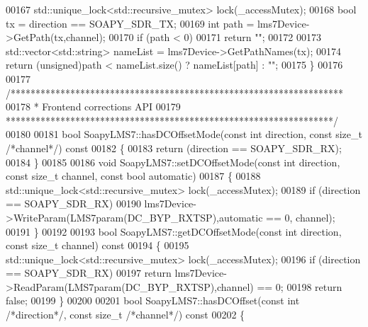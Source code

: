 \begin{DoxyCode}
{{{{{{00167     std::unique\_lock<std::recursive\_mutex> lock(_accessMutex);
00168     \textcolor{keywordtype}{bool} tx = direction == SOAPY_SDR_TX;
00169     \textcolor{keywordtype}{int} path = lms7Device->GetPath(tx,channel);
00170     \textcolor{keywordflow}{if} (path < 0)
00171         \textcolor{keywordflow}{return} \textcolor{stringliteral}{""};
00172 
00173     std::vector<std::string> nameList = lms7Device->GetPathNames(tx);
00174     \textcolor{keywordflow}{return} (\textcolor{keywordtype}{unsigned})path < nameList.size() ? nameList[path] : \textcolor{stringliteral}{""};
00175 \}
00176 
00177 \textcolor{comment}{/*******************************************************************}
00178 \textcolor{comment}{ * Frontend corrections API}
00179 \textcolor{comment}{ ******************************************************************/}
00180 
00181 \textcolor{keywordtype}{bool} SoapyLMS7::hasDCOffsetMode(\textcolor{keyword}{const} \textcolor{keywordtype}{int} direction, \textcolor{keyword}{const} \textcolor{keywordtype}{size\_t} \textcolor{comment}{/*channel*/})\textcolor{keyword}{ const}
00182 \textcolor{keyword}{}\{
00183     \textcolor{keywordflow}{return} (direction == SOAPY_SDR_RX);
00184 \}
00185 
00186 \textcolor{keywordtype}{void} SoapyLMS7::setDCOffsetMode(\textcolor{keyword}{const} \textcolor{keywordtype}{int} direction, \textcolor{keyword}{const} \textcolor{keywordtype}{size\_t} channel, \textcolor{keyword}{const} \textcolor{keywordtype}{bool} automatic)
00187 \{
00188     std::unique\_lock<std::recursive\_mutex> lock(_accessMutex);
00189     \textcolor{keywordflow}{if} (direction == SOAPY_SDR_RX)
00190         lms7Device->WriteParam(LMS7param(DC_BYP_RXTSP),automatic == 0, channel);
00191 \}
00192 
00193 \textcolor{keywordtype}{bool} SoapyLMS7::getDCOffsetMode(\textcolor{keyword}{const} \textcolor{keywordtype}{int} direction, \textcolor{keyword}{const} \textcolor{keywordtype}{size\_t} channel)\textcolor{keyword}{ const}
00194 \textcolor{keyword}{}\{
00195     std::unique\_lock<std::recursive\_mutex> lock(_accessMutex);
00196     \textcolor{keywordflow}{if} (direction == SOAPY_SDR_RX)
00197         \textcolor{keywordflow}{return} lms7Device->ReadParam(LMS7param(DC_BYP_RXTSP),channel) == 0;
00198     \textcolor{keywordflow}{return} \textcolor{keyword}{false};
00199 \}
00200 
00201 \textcolor{keywordtype}{bool} SoapyLMS7::hasDCOffset(\textcolor{keyword}{const} \textcolor{keywordtype}{int} \textcolor{comment}{/*direction*/}, \textcolor{keyword}{const} \textcolor{keywordtype}{size\_t} \textcolor{comment}{/*channel*/})\textcolor{keyword}{ const}
00202 \textcolor{keyword}{}\{
}}}}}}
\end{DoxyCode}
